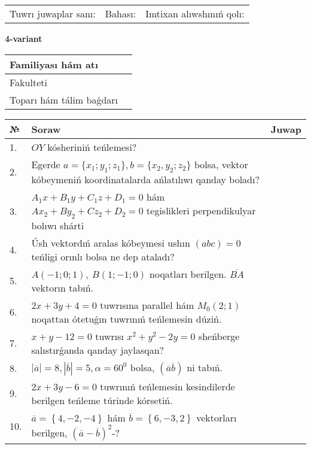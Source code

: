 \documentclass{article}
\begin{document}
\vspace{1cm}

\begin{tabular}{lll}
Tuwrı juwaplar sanı: \underline{\hspace{1.5cm}} & 
Bahası: \underline{\hspace{1.5cm}} & 
Imtixan alıwshınıń qolı: \underline{\hspace{2cm}} \\
\end{tabular}

\egroup

\newpage


\textbf{4-variant}\\

\bgroup
\def\arraystretch{1.6} %

\begin{tabular}{|m{5.7cm}|m{9.5cm}|}
\hline
Familiyası hám atı & \\
\hline
Fakulteti  & \\
\hline
Toparı hám tálim baǵdarı  & \\
\hline
\end{tabular}

\vspace{1cm}

\begin{tabular}{|m{0.7cm}|m{10cm}|m{4cm}|}
\hline
№ & Soraw & Juwap \\
\hline
1. & $OY$ kósheriniń teńlemesi? &  \\
\hline
2. & Egerde $a=\{ x_1; y_1; z_1\}, b=\{ x_2, y_2; z_2\}$ bolsa, vektor kóbeymeniń koordinatalarda ańlatılıwı qanday boladı? &  \\
\hline
3. & $A_1x+B_1y+C_1z+D_1=0$ hám $Ax_2+By_2+Cz_2+D_2=0$ tegislikleri perpendikulyar bolıwı shárti &  \\
\hline
4. & Úsh vektordıń aralas kóbeymesi ushın $(abc)=0$ teńligi orınlı bolsa ne dep ataladı? &  \\
\hline
5. & $A (-1;0;1),\ B (1;-1;0)$ noqatları berilgen. $\overline{BA}$ vektorın tabıń. &  \\
\hline
6. & $2x+3y+4=0$ tuwrısına parallel hám $M_{0} (2;1)$ noqattan ótetuǵın tuwrınıń teńlemesin dúziń. &  \\
\hline
7. & $x+y-12=0$ tuwrısı $x^{2}+y^{2}-2y=0$ sheńberge salıstırǵanda qanday jaylasqan? &  \\
\hline
8. & $\left| \overline{a} \right|=8, \left| \overline{b} \right|=5, \alpha=60^{0}$ bolsa, $( \overline{a}\overline{b} )$ ni tabıń. &  \\
\hline
9. & $2x+3y-6=0$ tuwrınıń teńlemesin kesindilerde berilgen teńleme túrinde kórsetiń. &  \\
\hline
10. & $\overline{a}=\left\{ 4,-2,-4 \right\}$ hám $\overline{b}=\left\{ 6,-3, 2 \right\}$ vektorları berilgen, $(\overline{a}-\overline{b}) ^{2}$-? &  \\
\hline
\end{tabular}
\end{document}
